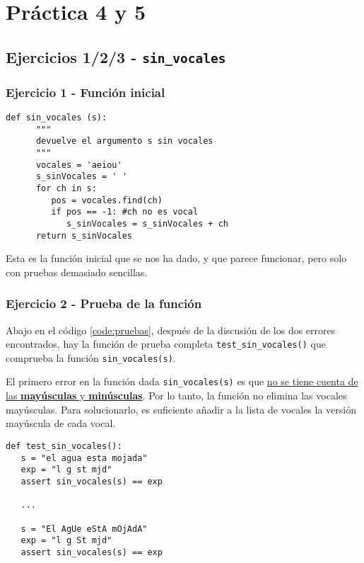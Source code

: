 \chapter{Práctica 4 y 5}

\lstset{language=python}


\section{Ejercicios 1/2/3 - \texttt{sin\_vocales}}

\subsection{Ejercicio 1 - Función inicial}
\begin{lstlisting}[captionpos=b,caption={Función inicial}]
   def sin_vocales (s):
      """
      devuelve el argumento s sin vocales
      """
      vocales = 'aeiou'
      s_sinVocales = ' '
      for ch in s:
         pos = vocales.find(ch)
         if pos == -1: #ch no es vocal
            s_sinVocales = s_sinVocales + ch
      return s_sinVocales
\end{lstlisting}

Esta es la función inicial que se nos ha dado, y que parece funcionar, pero solo con pruebas demasiado sencillas.

\subsection{Ejercicio 2 - Prueba de la función}

Abajo en el código \ref{code:pruebas}, después de la discusión de los dos errores encontrados, hay la función	de prueba completa \lstinline{test_sin_vocales()} que comprueba la función \lstinline{sin_vocales(s)}. 


\begin{paracol}{2}
   \colfill
   El primero error en la función dada \lstinline{sin_vocales(s)} es que \ul{no se tiene cuenta de las \textbf{mayúsculas} y \textbf{minúsculas}}. Por lo tanto, la función no elimina las vocales mayúsculas. Para solucionarlo, es suficiente añadir a la lista de vocales la versión mayúscula de cada vocal.
   \colfill

   \switchcolumn

   \begin{lstlisting}
def test_sin_vocales():
   s = "el agua esta mojada"
   exp = "l g st mjd"
   assert sin_vocales(s) == exp

   ...
      
   s = "El AgUe eStA mOjAdA"
   exp = "l g St mjd"
   assert sin_vocales(s) == exp
   \end{lstlisting}
\end{paracol}

